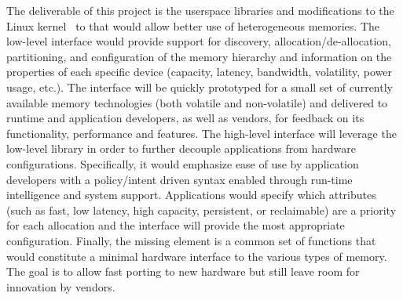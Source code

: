 The deliverable of this project is the userspace libraries and modifications to the Linux kernel~\cite{Williams:2017:NDH:3145617.3145620} to that would allow better use of heterogeneous memories. The low-level interface would provide support for discovery, allocation/de-allocation, partitioning, and configuration of the memory hierarchy and information on the properties of each specific device (capacity, latency, bandwidth, volatility, power usage, etc.). The interface will be quickly prototyped for a small set of currently available memory technologies (both volatile and non-volatile) and delivered to runtime and application developers, as well as vendors, for feedback on its functionality, performance and features. The high-level interface will leverage the low-level library in order to further decouple applications from hardware configurations. Specifically, it would emphasize ease of use by application developers with a policy/intent driven syntax enabled through run-time intelligence and system support. Applications would specify which attributes (such as fast, low latency, high capacity, persistent, or reclaimable) are a priority for each allocation and the interface will provide the most appropriate configuration. Finally, the missing element is a common set of functions that would constitute a minimal hardware interface to the various types of memory. The goal is to allow fast porting to new hardware but still leave room for innovation by vendors.



